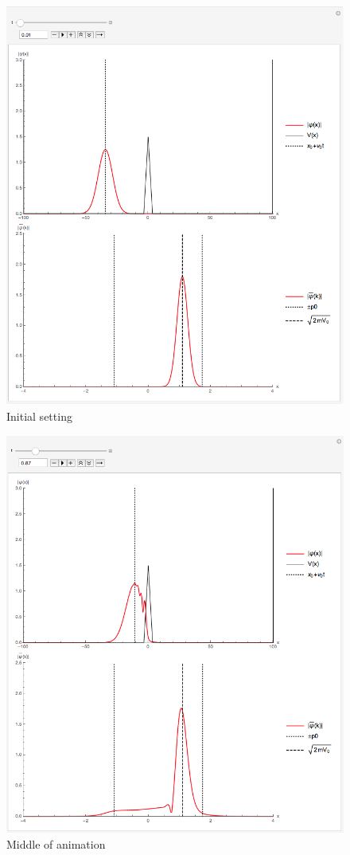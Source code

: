\documentclass[titlepage]{article}
\begin{document}
\begin{figure}[ht]
\centering
\includegraphics[scale=0.5,center]{images/triangular1.png}
\caption{Initial setting}
\label{fig:2d}
\end{figure}
\FloatBarrier

\begin{figure}[ht]
\centering
\includegraphics[scale=0.5,center]{images/triangular2.png}
\caption{Middle of animation}
\label{fig:2d}
\end{figure}
\FloatBarrier
\end{document}
